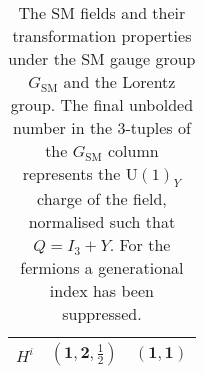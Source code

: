 \begin{table}[t]
\begin{tabular}{ccc}
    $H^{i}$                      & $(\mathbf{1}, \mathbf{2}, \tfrac{1}{2})$                                  & $(\mathbf{1}, \mathbf{1})$                      \\
    \bottomrule
  \end{tabular}
  \egroup
  \caption{The SM fields and their transformation properties under the SM gauge
    group $G_{\text{SM}}$ and the Lorentz group. The final unbolded number in
    the 3-tuples of the $G_{\text{SM}}$ column represents the $\mathrm{U}(1)_Y$
    charge of the field, normalised such that $Q = I_{3} + Y$. For the fermions
    a generational index has been suppressed.}
  \label{tbl:sm}
\end{table}
